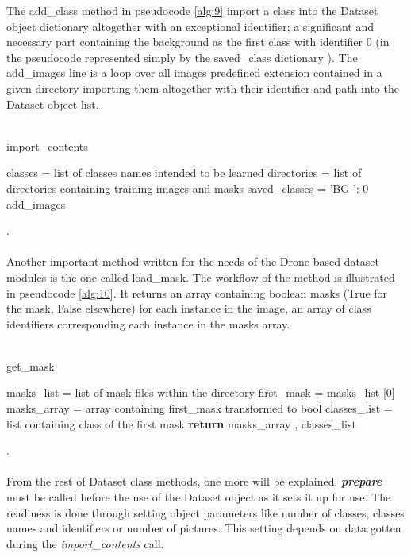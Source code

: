 The add\_class method in pseudocode \ref{alg:9} import a class into the Dataset object dictionary  altogether with an exceptional identifier; a significant and necessary part containing the background as the first class with identifier 0 (in the pseudocode represented simply by the saved\_class dictionary ). The add\_images line is a loop over all images predefined extension contained in a given directory importing them altogether with their identifier and path into the Dataset object list.
\\
\\
\begin{algorithm}[H] \label{alg:9}
  \caption{import\_contents}
  \SetAlgoLined
  \DontPrintSemicolon
   classes = list of classes names intended to be learned\;
  directories = list of directories containing training images and
  masks\;
  saved\_classes = {’BG ’: 0}\;
   {add\_images\;}
\end{algorithm}
.\\
\\ 
Another important method written for the needs of the Drone-based dataset modules is
the one called load\_mask. The workflow of the method is illustrated in pseudocode
\ref{alg:10}. It returns an array containing boolean masks (True for the mask, False elsewhere)
for each instance in the image, an array of class identifiers corresponding each instance in the masks array.
\\
\\
\begin{algorithm}[H] \label{alg:10}
  \caption{get\_mask}
  \SetAlgoLined
  \DontPrintSemicolon
masks\_list = list of mask files within the directory\;
first\_mask = masks\_list [0]\;
masks\_array = array containing first\_mask transformed to bool\;
classes\_list = list containing class of the first mask\;
\textbf{return} masks\_array , classes\_list\; 
\end{algorithm}
.\\
\\
From the rest of Dataset class methods, one more will be explained. \textit{\textbf{prepare}} must be called before the use of the Dataset object as it sets it up for use. The readiness is done through setting object parameters like number of classes, classes names and identifiers or number of pictures. This setting depends on data gotten during the \textit{import\_contents} call.
 
